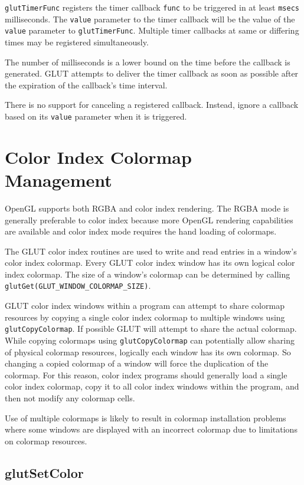 {\tt glutTimerFunc} registers the timer callback {\tt func} to be triggered
in at least {\tt msecs} milliseconds.  The {\tt value} parameter to the timer
callback will be the value of the {\tt value} parameter to {\tt glutTimerFunc}.
Multiple timer callbacks at same or differing times may be registered
simultaneously.

The number of milliseconds is a lower bound on the time before the
callback is generated.  GLUT attempts to deliver the timer callback
as soon as possible after the expiration of the callback's time interval.

There is no support for canceling a registered callback.  Instead,
ignore a callback based on its {\tt value} parameter when it is triggered.

\section{Color Index Colormap Management}

OpenGL supports both RGBA and color index rendering.  The RGBA mode is generally
preferable to color index because more OpenGL rendering capabilities are
available and color index mode requires the hand loading of colormaps.

The GLUT color index routines are used to write and read entries in a window's
color index colormap.  Every GLUT color index window has its own logical color
index colormap.  The size of a window's colormap can be determined by calling
{\tt glutGet(GLUT\_WINDOW\_COLORMAP\_SIZE)}.

GLUT color index windows within a program can attempt to share colormap resources
by copying a single color index colormap to multiple windows using {\tt glutCopyColormap}.
If possible GLUT will attempt to share the actual colormap.  While copying
colormaps using {\tt glutCopyColormap} can potentially allow sharing of
physical colormap resources, logically each window has its own colormap.  So
changing a copied colormap of a window will force the duplication of the colormap.
For this reason, color index programs should generally load a single color index
colormap, copy it to all color index windows within the program, and then not
modify any colormap cells.

Use of multiple colormaps is likely to result in
colormap installation problems where some windows are
displayed with an incorrect colormap due to limitations on colormap
resources.

\subsection{glutSetColor}


